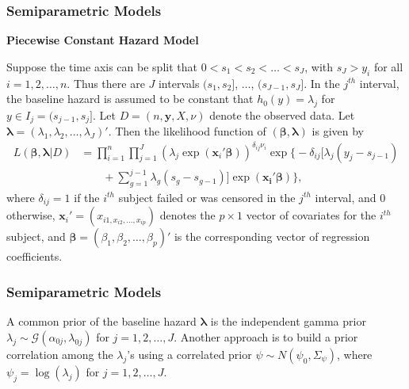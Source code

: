 \documentclass{beamer}
\begin{document}
	\begin{frame}
		\frametitle{Semiparametric Models}
		\textbf{Piecewise Constant Hazard Model}
		
		Suppose the time axis can be split that $0 < s_1 < s_2 < \dots < s_J$, with $s_J > y_i$ for all $i = 1, 2, \dots, n$. Thus there are $J$ intervals $(s_1, s_2]$, $\dots$, $(s_{J - 1}, s_J]$. In the $j ^ {th}$ interval, the baseline hazard is assumed to be constant that $h_0(y) = \lambda_j$ for $y \in I_j = (s_{j - 1}, s_j]$. Let $D = (n, \boldsymbol{y}, X, \nu)$ denote the observed data. Let $\boldsymbol{\lambda} = (\lambda_1, \lambda_2, \dots, \lambda_J)'$. Then the likelihood function of $(\boldsymbol{\beta},\boldsymbol{\lambda})$ is given by
		\begin{equation*}
			\begin{split}
				L(\boldsymbol{\beta}, \boldsymbol{\lambda} | D) & = \prod_{i = 1}^{n}\prod_{j = 1}^{J}(\lambda_j\exp(\boldsymbol{x}_i'\boldsymbol{\beta})) ^ {\delta_{ij}\nu_i}\exp\bigg\{-\delta_{ij}[\lambda_j(y_j - s_{j - 1})\\
				& \quad\quad + \sum_{g = 1}^{j - 1}\lambda_g(s_g - s_{g - 1})]\exp(\boldsymbol{x_i}'\boldsymbol{\beta})\bigg\},
			\end{split}
		\end{equation*}
		where $\delta_{ij} = 1$ if the $i ^ {th}$ subject failed or was censored in the $j ^ {th}$ interval, and $0$ otherwise, $\boldsymbol{x}_i' = (x_{i1, x_{i2}, \dots, x_{ip}})$ denotes the $p\times1$ vector of covariates for the $i ^ {th}$ subject, and $\boldsymbol{\beta} = (\beta_1, \beta_2, \dots, \beta_p)'$ is the corresponding vector of regression coefficients.
	\end{frame}
	
	\begin{frame}
		\frametitle{Semiparametric Models}
		A common prior of the baseline hazard $\boldsymbol{\lambda}$ is the independent gamma prior $\lambda_j\sim\mathcal{G}(\alpha_{0j}, \lambda_{0j})$ for $j = 1, 2, \dots, J$. Another approach is to build a prior correlation among the $\lambda_j$'s using a correlated prior $\psi\sim N(\psi_0, \Sigma_{\psi})$, where $\psi_j = \log(\lambda_j)$ for $j = 1, 2, \dots, J$.
	\end{frame}
	\begin{frame}[allowframebreaks]
		\begin{singlespace}
			
			
		\end{singlespace}
	\end{frame}
	
\end{document}
